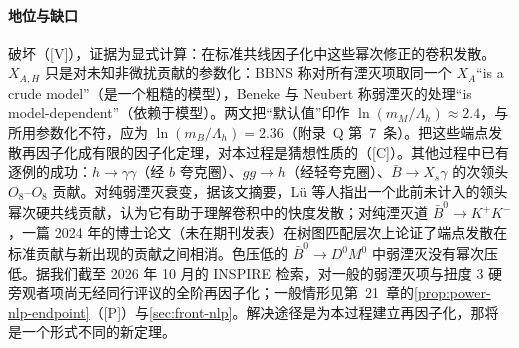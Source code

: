 \paragraph{地位与缺口}
破坏（[V]），证据为显式计算：在标准共线因子化中这些幂次修正的卷积发散。$X_{A,H}$ 只是对未知非微扰贡献的参数化：BBNS 称对所有湮灭项取同一个 $X_A$“is a crude model”（是一个粗糙的模型）\cite[第~3.5~节]{BenekeEtAl2001}，Beneke 与 Neubert 称弱湮灭的处理“is model-dependent”（依赖于模型）\cite[第~2.4~节]{BenekeNeubert2003}。两文把“默认值”印作 $\ln(m_M/\Lambda_h)\approx2.4$，与所用参数化不符，应为 $\ln(m_B/\Lambda_h)=2.36$（附录~Q 第~7~条）。把这些端点发散再因子化成有限的因子化定理，对本过程是猜想性质的（[C]）。其他过程中已有逐例的成功：$h\to\gamma\gamma$（经 $b$ 夸克圈）\cite{Liu:2019oav,Liu:2020wbn}、$gg\to h$（经轻夸克圈）\cite{Liu:2022ajh}、$\bar B\to X_s\gamma$ 的次领头 $O_8$--$O_8$ 贡献\cite{Hurth:2023paz}。对纯弱湮灭衰变，据该文摘要，Lü 等人指出一个此前未计入的领头幂次硬共线贡献，认为它有助于理解卷积中的快度发散\cite{Lu:2022kos}；对纯湮灭道 $\bar B^0\to K^+K^-$，一篇 2024 年的博士论文（未在期刊发表）在树图匹配层次上论证了端点发散在标准贡献与新出现的贡献之间相消\cite{Stillger:2024sgy}。色压低的 $\bar B^0\to D^0M^0$ 中弱湮灭没有幂次压低\cite{Mantry:2003uz}。据我们截至 2026 年 10 月的 INSPIRE 检索，对一般的弱湮灭项与扭度 3 硬旁观者项尚无经同行评议的全阶再因子化；一般情形见第~21~章的\cref{prop:power-nlp-endpoint}（[P]）与\cref{sec:front-nlp}。解决途径是为本过程建立再因子化，那将是一个形式不同的新定理。
